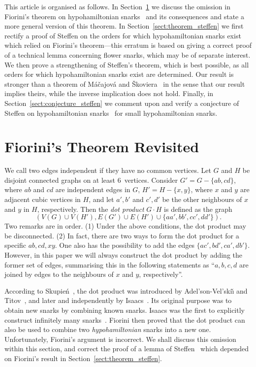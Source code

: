 \documentclass{amcjoucc}
\begin{document}
This article is organised as follows. In Section~\ref{sec:fiorini} we discuss the omission in Fiorini's theorem on hypohamiltonian snarks~\cite{Fi83} and its consequences and state a more general version of this theorem. In Section~\ref{sect:theorem_steffen} we first rectify a proof of Steffen on the orders for which hypohamiltonian snarks exist which relied on Fiorini's theorem---this erratum is based on giving a correct proof of a technical lemma concerning flower snarks, which may be of separate interest. We then prove a strengthening of Steffen's theorem, which is best possible, as all orders for which hypohamiltonian snarks exist are determined. Our result is stronger than a theorem of M\'{a}\v{c}ajov\'{a} and \v{S}koviera~\cite{MS06} in the sense that our result implies theirs, while the inverse implication does not hold. Finally, in Section~\ref{sect:conjecture_steffen} we comment upon and verify a conjecture of Steffen on hypohamiltonian snarks~\cite{steffen20151} for small hypohamiltonian snarks.


\section{Fiorini's Theorem Revisited}
\label{sec:fiorini}

We call two edges independent if they have no common vertices.
Let $G$ and $H$ be disjoint connected graphs on at least 6~vertices. Consider $G' = G - \{ ab, cd \}$, where $ab$ and $cd$ are independent edges in $G$, $H' = H - \{ x,y \}$, where $x$ and $y$ are adjacent cubic vertices in $H$, and let $a',b'$ and $c',d'$ be the other neighbours of $x$ and $y$ in $H$, respectively. Then the \emph{dot product} $G \cdot H$ is defined as the graph $$(V(G) \cup V(H'), E(G') \cup E(H') \cup \{ aa', bb', cc', dd' \}).$$ Two remarks are in order. (1) Under the above conditions, the dot product may be disconnected. (2) In fact, there are two ways to form the dot product for a specific $ab, cd, xy$. One also has the possibility to add the edges $\{ ac', bd', ca', db' \}$. However, in this paper we will always construct the dot product by adding the former set of edges, summarising this in the following statements as ``$a, b, c, d$ are joined by edges to the neighbours of $x$ and $y$, respectively''.

According to Skupie\'n~\cite{Sk16}, the dot product was introduced by Adel'son-Vel'ski\v{\i} and Titov~\cite{AT73}, and later and independently by Isaacs~\cite{Is75}. Its original purpose was to obtain new snarks by combining known snarks. Isaacs was the first to explicitly construct infinitely many snarks~\cite{Is75}. Fiorini then proved that the dot product can also be used to combine two \emph{hypohamiltonian} snarks into a new one. Unfortunately, Fiorini's argument is incorrect. We shall discuss this omission within this section, and correct the proof of a lemma of Steffen~\cite{St01} which depended on Fiorini's result in Section~\ref{sect:theorem_steffen}.
\end{document}

